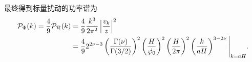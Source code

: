 最终得到标量扰动的功率谱为
\begin{align}
  \mathcal{P}_{\Phi}(k)=\frac{4}{9}\mathcal{P}_{\mathcal{R}}(k) 
  &= \frac{4}{9}\frac{k^3}{2\pi^2}\left\lvert\frac{v_{k}}{z}\right\rvert^2 \\
               &= \frac{4}{9}2^{2\nu -3}\left(\frac{\Gamma(\nu)}{\Gamma(3 /2)}\right)^2
               \left(\frac{H}{\dot{\varphi_0}}\right)^2
               \left(\frac{H}{2\pi}\right)^2
               \left(\frac{k}{aH}\right)^{3-2\nu}
             \Bigg\rvert_{k=aH}.
\end{align}


% 
